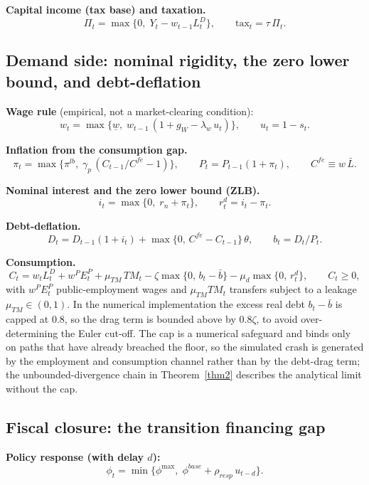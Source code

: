 \documentclass[review,12pt]{elsarticle}
\theoremstyle{plain}
\theoremstyle{definition}
\theoremstyle{remark}
\newcommand{\barL}{\bar{L}}
\begin{document}
\textbf{Capital income (tax base) and taxation.}
\begin{equation}
\Pi_t=\max\{0,\;Y_t-w_{t-1}L_t^D\},\qquad \text{tax}_t=\tau\,\Pi_t.
\end{equation}

\subsection{Demand side: nominal rigidity, the zero lower bound, and debt-deflation}
\textbf{Wage rule} (empirical, not a market-clearing condition):
\begin{equation}
w_t=\max\{\underline{w},\;w_{t-1}\,(1+g_W-\lambda_w\,u_t)\},\qquad u_t=1-s_t.
\end{equation}

\textbf{Inflation from the consumption gap.}
\begin{equation}
\pi_t=\max\{\pi^{lb},\;\gamma_p\,(C_{t-1}/C^{fe}-1)\},\qquad P_t=P_{t-1}(1+\pi_t),
\qquad C^{fe}\equiv w\,\barL.
\end{equation}

\textbf{Nominal interest and the zero lower bound (ZLB).}
\begin{equation}
i_t=\max\{0,\;r_n+\pi_t\},\qquad r_t^d=i_t-\pi_t.
\end{equation}

\textbf{Debt-deflation.}
\begin{equation}
D_t=D_{t-1}(1+i_t)+\max\{0,\,C^{fe}-C_{t-1}\}\,\theta,\qquad b_t=D_t/P_t.
\end{equation}

\textbf{Consumption.}
\begin{equation}
C_t=w_tL_t^D+w^P E_t^P+\mu_{TM}\,TM_t
-\zeta\max\{0,\,b_t-\bar b\}-\mu_d\max\{0,\,r_t^d\},\qquad C_t\ge0,
\end{equation}
with $w^P E_t^P$ public-employment wages and $\mu_{TM}TM_t$ transfers subject to a leakage $\mu_{TM}\in(0,1)$. In the numerical implementation the excess real debt $b_t-\bar b$ is capped at $0.8$, so the drag term is bounded above by $0.8\zeta$, to avoid over-determining the Euler cut-off. The cap is a numerical safeguard and binds only on paths that have already breached the floor, so the simulated crash is generated by the employment and consumption channel rather than by the debt-drag term; the unbounded-divergence chain in Theorem~\ref{thm2} describes the analytical limit without the cap.

\subsection{Fiscal closure: the transition financing gap}
\textbf{Policy response (with delay $d$):}
\begin{equation}
\phi_t=\min\{\phi^{\max},\;\phi^{base}+\rho_{resp}\,u_{t-d}\}.
\end{equation}
\end{document}
